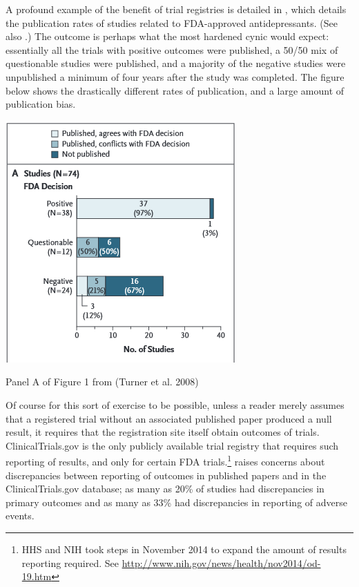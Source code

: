 \documentclass[12pt] {article}
\begin{document}
A profound example of the benefit of trial registries is detailed in
\cite{turner_selective_2008}, which details the publication rates of studies
related to FDA-approved antidepressants. (See also \cite{ioannidis_effectiveness_2008}.)
The outcome is perhaps what the most hardened cynic would expect:
essentially all the trials with positive outcomes were published, a
50/50 mix of questionable studies were published, and a majority of the
negative studies were unpublished a minimum of four years after the
study was completed. The figure below shows the drastically different
rates of publication, and a large amount of publication bias.
\begin{center}
\includegraphics{TurnerFigure1.PNG}

Panel A of Figure 1 from (Turner et al. 2008)
\end{center}
Of course for this sort of exercise to be possible, unless a reader
merely assumes that a registered trial without an associated published
paper produced a null result, it requires that the registration site
itself obtain outcomes of trials. ClinicalTrials.gov is the only
publicly available trial registry that requires such reporting of
results, and only for certain FDA trials.\footnote{HHS and NIH took steps in November 2014 to expand the amount of results reporting required. See \url{http://www.nih.gov/news/health/nov2014/od-19.htm}}  \cite{hartung_reporting_2014} raises
concerns about discrepancies between reporting of outcomes in published
papers and in the ClinicalTrials.gov database; as many as 20\% of
studies had discrepancies in primary outcomes and as many as 33\% had
discrepancies in reporting of adverse events.
\end{document}
